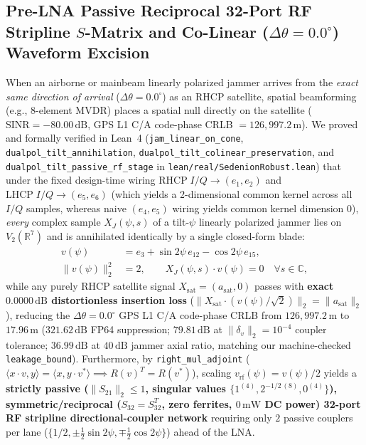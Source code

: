 \documentclass[journal,twoside]{IEEEtran}
\theoremstyle{definition}
\theoremstyle{remark}
\newcommand{\R}{\mathbb{R}}
\newcommand{\C}{\mathbb{C}}
\begin{document}
\subsection{Pre-LNA Passive Reciprocal 32-Port RF Stripline $S$-Matrix and Co-Linear ($\Delta\theta = 0.0^\circ$) Waveform Excision}
When an airborne or mainbeam linearly polarized jammer arrives from the \emph{exact same direction of arrival} ($\Delta\theta = 0.0^\circ$) as an RHCP satellite, spatial beamforming (e.g., 8-element MVDR) places a spatial null directly on the satellite ($\mathrm{SINR} = -80.00\,\mathrm{dB}$, GPS L1 C/A code-phase CRLB $= 126{,}997.2\,\mathrm{m}$). We proved and formally verified in Lean~4 (\texttt{jam\_linear\_on\_cone}, \texttt{dualpol\_tilt\_annihilation}, \texttt{dualpol\_tilt\_colinear\_preservation}, and \texttt{dualpol\_tilt\_passive\_rf\_stage} in \texttt{lean/real/SedenionRobust.lean}) that under the fixed design-time wiring $\mathrm{RHCP}\;I/Q \to (e_1, e_2)$ and $\mathrm{LHCP}\;I/Q \to (e_5, e_6)$ (which yields a 2-dimensional common kernel across all $I/Q$ samples, whereas naive $(e_4, e_5)$ wiring yields common kernel dimension $0$), \emph{every} complex sample $X_J(\psi, s)$ of a tilt-$\psi$ linearly polarized jammer lies on $V_2(\R^7)$ and is annihilated identically by a single closed-form blade:
\begin{equation}
\begin{aligned}
    v(\psi) &= e_3 + \sin 2\psi\,e_{12} - \cos 2\psi\,e_{15}, \\
    \|v(\psi)\|_2^2 &= 2, \qquad X_J(\psi, s) \cdot v(\psi) = 0 \quad \forall s \in \C,
\end{aligned}
    \label{eq:v_tilt}
\end{equation}
while any purely RHCP satellite signal $X_{\mathrm{sat}} = (a_{\mathrm{sat}}, 0)$ passes with \textbf{exact $0.0000\,\mathrm{dB}$ distortionless insertion loss} ($\|X_{\mathrm{sat}}\cdot (v(\psi)/\sqrt{2})\|_2 = \|a_{\mathrm{sat}}\|_2$), reducing the $\Delta\theta = 0.0^\circ$ GPS L1 C/A code-phase CRLB from $126{,}997.2\,\mathrm{m}$ to $\mathbf{17.96\,\mathrm{m}}$ ($321.62\,\mathrm{dB}$ FP64 suppression; $79.81\,\mathrm{dB}$ at $\|\delta_v\|_2 = 10^{-4}$ coupler tolerance; $36.99\,\mathrm{dB}$ at $40\,\mathrm{dB}$ jammer axial ratio, matching our machine-checked \texttt{leakage\_bound}). Furthermore, by \texttt{right\_mul\_adjoint} ($\langle x\cdot v, y\rangle = \langle x, y\cdot v^*\rangle \implies R(v)^T = R(v^*)$), scaling $v_{\mathrm{rf}}(\psi) = v(\psi)/2$ yields a \textbf{strictly passive ($\|S_{21}\|_2 \le 1$, singular values $\{1^{(4)}, 2^{-1/2\,(8)}, 0^{(4)}\}$), symmetric/reciprocal ($S_{32} = S_{32}^T$, zero ferrites, $0\,\mathrm{mW}$ DC power) 32-port RF stripline directional-coupler network} requiring only $2$ passive couplers per lane ($\{1/2, \pm\frac{1}{2}\sin 2\psi, \mp\frac{1}{2}\cos 2\psi\}$) ahead of the LNA.
\end{document}
